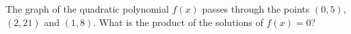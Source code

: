 The graph of the quadratic polynomial $f(x)$ passes through the points $(0,5)$, $(2,21)$ and $(1,8)$. What is the product of the solutions of $f(x)=0$?
